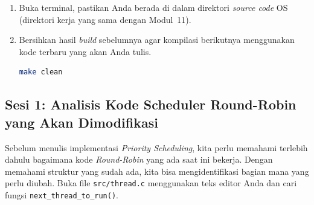 \begin{enumerate}
	\item Buka terminal, pastikan Anda berada di dalam direktori \textit{source code} OS (direktori kerja yang sama dengan Modul~11).
	\item Bersihkan hasil \textit{build} sebelumnya agar kompilasi berikutnya menggunakan kode terbaru yang akan Anda tulis.
	      \begin{lstlisting}[language=bash, caption={Bersihkan build sebelumnya}]
make clean
    \end{lstlisting}
\end{enumerate}

\subsection{Sesi 1: Analisis Kode Scheduler Round-Robin yang Akan Dimodifikasi}
\label{sec:m12-sesi-1}

Sebelum menulis implementasi \textit{Priority Scheduling}, kita perlu memahami terlebih dahulu bagaimana kode \textit{Round-Robin} yang ada saat ini bekerja. Dengan memahami struktur yang sudah ada, kita bisa mengidentifikasi bagian mana yang perlu diubah. Buka file \texttt{src/thread.c} menggunakan teks editor Anda dan cari fungsi \texttt{next\_thread\_to\_run()}.

